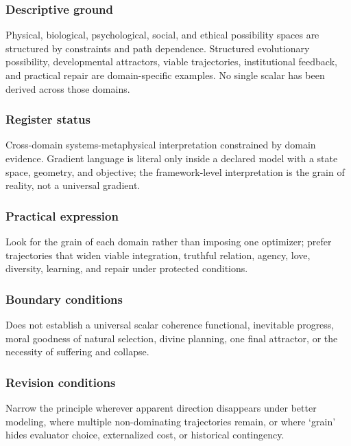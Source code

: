 \documentclass[
  11pt,
]{article}
\begin{document}
\subsubsection{Descriptive ground}\label{descriptive-ground-2}

Physical, biological, psychological, social, and ethical possibility
spaces are structured by constraints and path dependence. Structured
evolutionary possibility, developmental attractors, viable trajectories,
institutional feedback, and practical repair are domain-specific
examples. No single scalar has been derived across those domains.

\subsubsection{Register status}\label{register-status-2}

Cross-domain systems-metaphysical interpretation constrained by domain
evidence. Gradient language is literal only inside a declared model with
a state space, geometry, and objective; the framework-level
interpretation is the grain of reality, not a universal gradient.

\subsubsection{Practical expression}\label{practical-expression-2}

Look for the grain of each domain rather than imposing one optimizer;
prefer trajectories that widen viable integration, truthful relation,
agency, love, diversity, learning, and repair under protected
conditions.

\subsubsection{Boundary conditions}\label{boundary-conditions-2}

Does not establish a universal scalar coherence functional, inevitable
progress, moral goodness of natural selection, divine planning, one
final attractor, or the necessity of suffering and collapse.

\subsubsection{Revision conditions}\label{revision-conditions-2}

Narrow the principle wherever apparent direction disappears under better
modeling, where multiple non-dominating trajectories remain, or where
`grain' hides evaluator choice, externalized cost, or historical
contingency.
\end{document}
